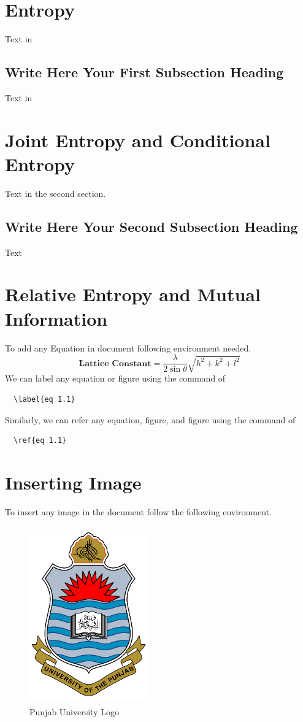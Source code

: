 \section{Entropy}
\hspace{1em}
Text in  
\subsection{Write Here Your First Subsection Heading}
\hspace{1em}
Text in  
\section{Joint Entropy and Conditional Entropy}
\hspace{1em}
Text in the second section. 
\subsection{Write Here Your Second Subsection Heading}
\hspace{4em}
Text  
\section{Relative Entropy and Mutual Information}
To add any Equation in document following environment needed.
\begin{equation}
 \textbf{Lattice Constant} =\frac{\lambda}{2\sin{\theta}}\sqrt{h^2+k^2+l^2}
 \label{eq 1.1}
\end{equation}
We can label any equation or figure using the command of  \begin{verbatim}
  \label{eq 1.1}  
\end{verbatim}
Similarly, we can refer any equation, figure, and figure using the command of\begin{verbatim}
  \ref{eq 1.1} 
\end{verbatim}
\section{Inserting Image}
To insert any image in the document follow the following environment.
\begin{figure}[hbt!]
    \centering
    \includegraphics[width=2in,height=3in]{Images/pulogo.png}
    \caption{Punjab University Logo}
    \label{fig:my_label}
\end{figure}
